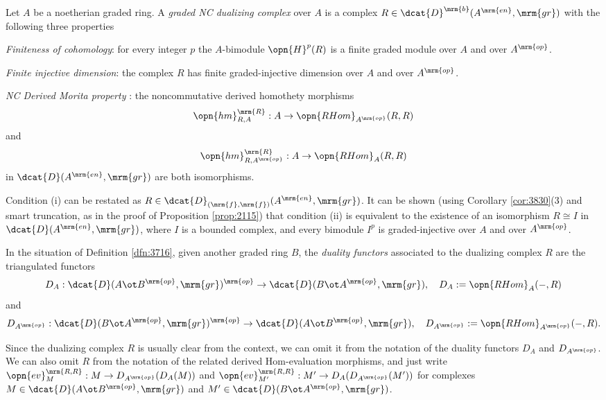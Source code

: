 \begin{dfn}[\cite{Ye1}] \label{dfn:3716} 
Let $A$ be a noetherian graded ring. A 
{\em graded NC dualizing complex}%
over $A$ is a complex 
$R \in \dcat{D}^{\mrm{b}}(A^{\mrm{en}}, \mrm{gr})$
with the following three properties\tup{:}
\begin{enumerate}
 {\em Finiteness of cohomology}: for every integer $p$ the 
$A$-bimodule 
$\opn{H}^p(R)$ is a finite graded module over $A$ and over 
$A^{\mrm{op}}$. 

 {\em Finite injective dimension}: the complex $R$ has finite 
graded-injective dimension over $A$ and over $A^{\mrm{op}}$. 

 {\em NC Derived Morita property}%
:
the noncommutative derived homothety morphisms 
\[ \opn{hm}^{\mrm{R}}_{R, A} : A \to \opn{RHom}_{A^{\mrm{op}}}(R, R) \]
and
\[ \opn{hm}^{\mrm{R}}_{R, A^{\mrm{op}}} : A \to \opn{RHom}_A(R, R) \]
in $\dcat{D}(A^{\mrm{en}}, \mrm{gr})$
are both isomorphisms.
\end{enumerate}
\end{dfn}

Condition (i) can be restated as 
$R \in \dcat{D}_{(\mrm{f}, \mrm{f})}(A^{\mrm{en}}, \mrm{gr})$.
It can be shown (using Corollary \ref{cor:3830}(3) and smart truncation, as in 
the proof of Proposition \ref{prop:2115}) 
that condition (ii) is equivalent to the existence of an 
isomorphism $R \cong I$ in $\dcat{D}(A^{\mrm{en}}, \mrm{gr})$,
where $I$ is a bounded complex, and every bimodule $I^p$ is 
graded-injective over $A$ and over $A^{\mrm{op}}$.

\begin{dfn} \label{dfn:3820}
In the situation of Definition \ref{dfn:3716}, 
given another graded ring $B$, the 
{\em duality functors}%
associated to the dualizing complex $R$ are the triangulated functors 
\[ D_A : \dcat{D}(A \ot B^{\mrm{op}}, \mrm{gr})^{\mrm{op}} \to 
\dcat{D}(B \ot A^{\mrm{op}}, \mrm{gr}), \quad 
D_A := \opn{RHom}_A(-, R)   \]
and 
\[ D_{A^{\mrm{op}}} : 
\dcat{D}(B \ot A^{\mrm{op}}, \mrm{gr})^{\mrm{op}} 
\to \dcat{D}(A \ot B^{\mrm{op}}, \mrm{gr}), \quad 
D_{A^{\mrm{op}}} := \opn{RHom}_{A^{\mrm{op}}}(-, R) .  \]
\end{dfn}

Since the dualizing complex $R$ is usually clear from the context, we can omit 
it from the notation of the duality functors 
$D_A$ and $D_{A^{\mrm{op}}}$. We can also omit $R$ from the notation of 
the related derived Hom-evaluation morphisms, and just write 
$\opn{ev}^{\mrm{R, R}}_{M} : M \to D_{A^{\mrm{op}}}(D_{A}(M))$
and
$\opn{ev}^{\mrm{R, R}}_{M'} : M' \to D_{A}(D_{A^{\mrm{op}}}(M'))$
for complexes
$M \in  \dcat{D}(A \ot B^{\mrm{op}}, \mrm{gr})$
and 
$M' \in  \dcat{D}(B \ot A^{\mrm{op}}, \mrm{gr})$. 

